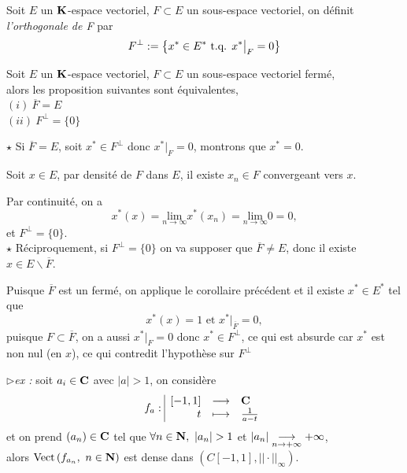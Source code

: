 \documentclass[a4paper,11pt, twoside]{article}
\begin{document}
\begin{Def}
  Soit $E$ un $\mathbf K$-espace vectoriel, $F\subset E$ un sous-espace vectoriel, on définit \emph{l'orthogonale de F} par 
  $$F^\bot:=\left\{x^*\in E^*\text{ t.q. } x^*\big|_F=0\right\}$$
\end{Def}


\begin{corollaire}
  Soit $E$ un $\mathbf K$-espace vectoriel, $F\subset E$ un sous-espace vectoriel fermé,\\

  alors les proposition suivantes sont équivalentes,\\
  $(i)\ \overline{F}=E$\\
  $(ii)\ F^\bot=\{0\}$
\end{corollaire}


\begin{Proof}
  $\star$ Si $\overline F=E$, soit $x^*\in F^\bot$ donc $x^*\big|_F=0$, montrons que $x^*=0$. 
  
  Soit $x\in E$, par densité de $F$ dans $E$, il existe $x_n\in F$ convergeant vers $x$. 
  
  Par continuité, on a 
  $$x^*(x)=\underset{n\to\infty}{\mathrm{lim}}x^*(x_n)=\underset{n\to\infty}{\mathrm{lim}} 0=0,$$
  et $F^\bot=\{0\}$.\\

  $\star$ Réciproquement, si $F^\bot=\{0\}$ on va supposer que $\overline F\neq E$, donc il existe $x\in E\backslash\overline{F}$.
  
  Puisque $\overline{F}$ est un fermé, on applique le corollaire précédent et il existe $x^*\in E^*$ tel que 
  $$x^*(x)=1\text{ et }x^*\big|_{\overline{F}}=0,$$
  puisque $F\subset\overline{F}$, on a aussi $x^*\big|_{{F}}=0$ donc $x^*\in F^\bot$, ce qui est absurde car $x^*$ est non nul (en $x$), ce qui contredit l'hypothèse sur $F^\bot$
\end{Proof}


$\triangleright$\emph{ex :} soit $a_i\in\mathbf C$ avec $|a|>1$, on considère
$$f_a:\begin{array}{|rcl}
  [-1,1]&\longrightarrow&\mathbf C\\
  t&\longmapsto&\frac{1}{a-t}
\end{array}$$
et on prend $(a_n)\in \mathbf C$ tel que $\forall n\in\N,\ |a_n|>1$ et $|a_n|\underset{n\to+\infty}{\longrightarrow} +\infty$,\\

alors $\mathrm{Vect}\left(f_{a_n},\ n\in\N\right)$ est dense dans $\left(C[-1,1],||\cdot||_\infty\right)$.
\end{document}
